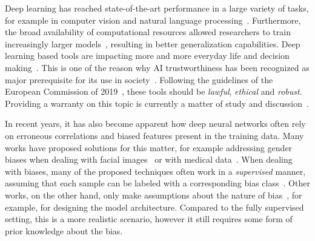 \label{sec:introduction}
Deep learning has reached state-of-the-art performance in a large variety of tasks, for example in computer vision and natural language processing~\cite{voulodimos2018deep, NEURIPS2020_1457c0d6}.
Furthermore, the broad availability of computational resources allowed researchers to train increasingly larger models~\cite{dosovitskiy2020vit, NEURIPS2020_1457c0d6}, resulting in better generalization capabilities. 
Deep learning based tools are impacting more and more everyday life and decision making~\cite{laumer2015impact}. This is one of the reason why AI trustworthiness has been recognized as major prerequisite for its use in society~\cite{hleg2019ethics, zhang2019artificial}. 
Following the guidelines of the European Commission of 2019~\cite{hleg2019ethics}, these tools should be \emph{lawful}, \emph{ethical} and \emph{robust}.
Providing a warranty on this topic is currently a matter of study and discussion~\cite{schramowski2020making, stock2020eccv, teso2019aies_XIML, revisetool, barbano2021bridging}.

In recent years, it has also become apparent how deep neural networks often rely on erroneous correlations and biased features present in the training data. Many works have proposed solutions for this matter, for example addressing gender biases when dealing with facial images~\cite{nam2020learning, Kim_2019_CVPR, zhao2021learning, lee2021learning} or with medical data~\cite{tartaglione2021end, dufumier2021brain}. 
When dealing with biases, many of the proposed techniques often work in a \emph{supervised} manner, assuming that each sample can be labeled with a corresponding bias class~\cite{alvi2018turning, tartaglione2021end,Kim_2019_CVPR}.
Other works, on the other hand, only make assumptions about the nature of bias~\cite{bahng2019rebias,cadene2019rubi}, for example, for designing the model architecture. Compared to the fully supervised setting, this is a more realistic scenario, however it still requires some form of prior knowledge about the bias.


